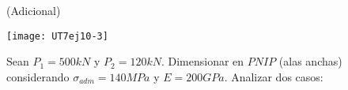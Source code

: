 \ejercicio (Adicional)

\begin{center}
\texttt{[image: UT7ej10-3]}
\end{center}

Sean $P_1=500 kN$ y $P_2=120 kN$. Dimensionar en $PNIP$ (alas anchas) considerando $\sigma_{adm}=140MPa$ y $E=200GPa$. Analizar dos casos:

\begin{figure}[htb]
	\centering
\subfloat[Caso 1]{
\texttt{[image: UT7ej10-1]}
	\label{fig:UT710.1}}
~
\subfloat[Caso 2]{
\texttt{[image: UT7ej10-2]}
	\label{fig:UT710.2}}
\caption{}
	\label{fig:UT710}
\end{figure}
